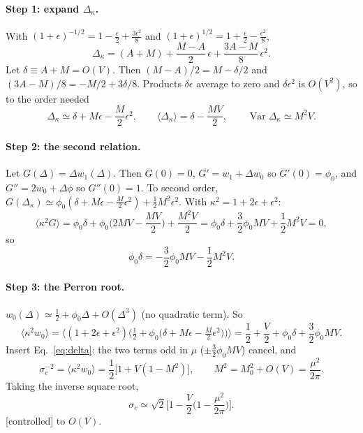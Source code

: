 \documentclass[11pt]{article}
\newcommand{\Var}{\operatorname{Var}}
\newcommand{\controlled}{\textsf{\small[controlled]}}
\begin{document}
\paragraph{Step 1: expand $\Delta_\kappa$.}  With $(1+\epsilon)^{-1/2}=1-\tfrac\epsilon2+\tfrac{3\epsilon^2}8$ and
$(1+\epsilon)^{1/2}=1+\tfrac\epsilon2-\tfrac{\epsilon^2}8$,
\begin{equation}
\Delta_\kappa=(A+M)+\frac{M-A}{2}\,\epsilon+\frac{3A-M}{8}\,\epsilon^2 .
\end{equation}
Let $\delta\equiv A+M=O(V)$.  Then $(M-A)/2=M-\delta/2$ and $(3A-M)/8=-M/2+3\delta/8$.  Products $\delta\epsilon$ average
to zero and $\delta\epsilon^2$ is $O(V^2)$, so to the order needed
\begin{equation}
\Delta_\kappa\simeq\delta+M\epsilon-\frac M2\epsilon^2,\qquad \langle\Delta_\kappa\rangle=\delta-\frac{MV}2,\qquad \Var\Delta_\kappa\simeq M^2V.
\end{equation}

\paragraph{Step 2: the second relation.}  Let $G(\Delta)=\Delta w_1(\Delta)$.  Then $G(0)=0$,
$G'=w_1+\Delta w_0$ so $G'(0)=\phi_0$, and $G''=2w_0+\Delta\phi$ so $G''(0)=1$.  To second order,
$G(\Delta_\kappa)\simeq\phi_0(\delta+M\epsilon-\tfrac M2\epsilon^2)+\tfrac12M^2\epsilon^2$.  With $\kappa^2=1+2\epsilon+\epsilon^2$:
\begin{equation}
\langle\kappa^2G\rangle=\phi_0\delta+\phi_0\Big(2MV-\frac{MV}2\Big)+\frac{M^2V}2=\phi_0\delta+\frac32\phi_0MV+\frac12M^2V=0,
\end{equation}
so
\begin{equation}
\phi_0\delta=-\frac32\phi_0MV-\frac12M^2V .
\label{eq:delta}
\end{equation}

\paragraph{Step 3: the Perron root.}  $w_0(\Delta)\simeq\tfrac12+\phi_0\Delta+O(\Delta^3)$ (no quadratic term).  So
\begin{equation}
\langle\kappa^2w_0\rangle=\Big\langle(1+2\epsilon+\epsilon^2)\Big(\tfrac12+\phi_0\big(\delta+M\epsilon-\tfrac M2\epsilon^2\big)\Big)\Big\rangle
=\frac12+\frac V2+\phi_0\delta+\frac32\phi_0MV .
\end{equation}
Insert Eq.~\eqref{eq:delta}: the two terms odd in $\mu$ ($\pm\tfrac32\phi_0MV$) cancel, and
\begin{equation}
\sigma_c^{-2}=\langle\kappa^2w_0\rangle=\frac12\big[1+V(1-M^2)\big],\qquad M^2=M_0^2+O(V)=\frac{\mu^2}{2\pi}.
\end{equation}
Taking the inverse square root,
\begin{equation}
\boxed{\sigma_c\simeq\sqrt2\Big[1-\frac V2\Big(1-\frac{\mu^2}{2\pi}\Big)\Big].}
\label{eq:sigmac}
\end{equation}
\controlled{} to $O(V)$.
\end{document}
